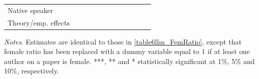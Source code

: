 \begin{table}
\begin{threeparttable}
\begin{tabular}{p{3cm}S@{}S@{}S@{}S@{}S@{}S@{}S@{}S@{}S@{}S@{}S@{}}
            Native speaker                &               &           {}   &               &           {}   &               &           {}   &               &           {}   &               &               &               \\
            Theory/emp. effects           &               &           {}   &               &           {}   &               &           {}   &               &           {}   &               &               &               \\
            \bottomrule
        \end{tabular}
        \begin{tablenotes}
            \tiny
            \item \textit{Notes}. Estimates are identical to those in \autoref{table6llm_FemRatio}, except that female ratio has been replaced with a dummy variable equal to 1 if at least one author on a paper is female. ***, ** and * statistically significant at 1\%, 5\% and 10\%, respectively.
        \end{tablenotes}
    \end{threeparttable}

\end{table}
